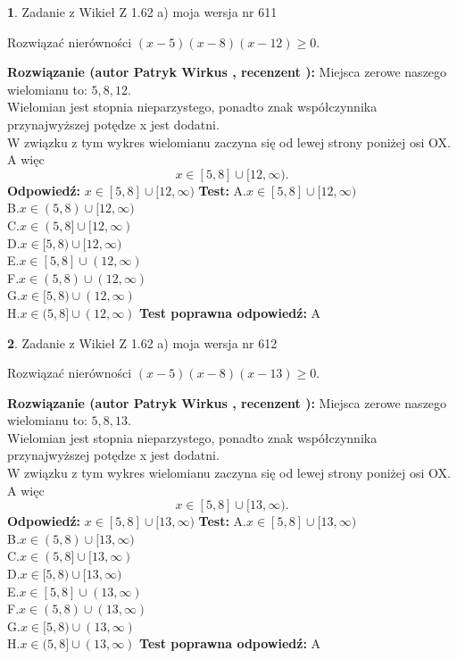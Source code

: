 \documentclass[12pt, a4paper]{article}
\theoremstyle{definition} %
\newtheorem{zad}{}
\newcommand{\zadStart}[1]{\begin{zad}#1\newline}
\newcommand{\zadStop}{\end{zad}}
\newcommand{\rozwStart}[2]{\noindent \textbf{Rozwiązanie (autor #1 , recenzent #2): }\newline}
\newcommand{\rozwStop}{\newline}
\newcommand{\odpStart}{\noindent \textbf{Odpowiedź:}\newline}
\newcommand{\odpStop}{\newline}
\newcommand{\testStart}{\noindent \textbf{Test:}\newline}
\newcommand{\testStop}{\newline}
\newcommand{\kluczStart}{\noindent \textbf{Test poprawna odpowiedź:}\newline}
\newcommand{\kluczStop}{\newline}
\begin{document}
\zadStart{Zadanie z Wikieł Z 1.62 a) moja wersja nr 611}

Rozwiązać nierówności $(x-5)(x-8)(x-12)\ge0$.
\zadStop
\rozwStart{Patryk Wirkus}{}
Miejsca zerowe naszego wielomianu to: $5, 8, 12$.\\
Wielomian jest stopnia nieparzystego, ponadto znak współczynnika przy\linebreak najwyższej potędze x jest dodatni.\\ W związku z tym wykres wielomianu zaczyna się od lewej strony poniżej osi OX. A więc $$x \in [5,8] \cup [12,\infty).$$
\rozwStop
\odpStart
$x \in [5,8] \cup [12,\infty)$
\odpStop
\testStart
A.$x \in [5,8] \cup [12,\infty)$\\
B.$x \in (5,8) \cup [12,\infty)$\\
C.$x \in (5,8] \cup [12,\infty)$\\
D.$x \in [5,8) \cup [12,\infty)$\\
E.$x \in [5,8] \cup (12,\infty)$\\
F.$x \in (5,8) \cup (12,\infty)$\\
G.$x \in [5,8) \cup (12,\infty)$\\
H.$x \in (5,8] \cup (12,\infty)$
\testStop
\kluczStart
A
\kluczStop



\zadStart{Zadanie z Wikieł Z 1.62 a) moja wersja nr 612}

Rozwiązać nierówności $(x-5)(x-8)(x-13)\ge0$.
\zadStop
\rozwStart{Patryk Wirkus}{}
Miejsca zerowe naszego wielomianu to: $5, 8, 13$.\\
Wielomian jest stopnia nieparzystego, ponadto znak współczynnika przy\linebreak najwyższej potędze x jest dodatni.\\ W związku z tym wykres wielomianu zaczyna się od lewej strony poniżej osi OX. A więc $$x \in [5,8] \cup [13,\infty).$$
\rozwStop
\odpStart
$x \in [5,8] \cup [13,\infty)$
\odpStop
\testStart
A.$x \in [5,8] \cup [13,\infty)$\\
B.$x \in (5,8) \cup [13,\infty)$\\
C.$x \in (5,8] \cup [13,\infty)$\\
D.$x \in [5,8) \cup [13,\infty)$\\
E.$x \in [5,8] \cup (13,\infty)$\\
F.$x \in (5,8) \cup (13,\infty)$\\
G.$x \in [5,8) \cup (13,\infty)$\\
H.$x \in (5,8] \cup (13,\infty)$
\testStop
\kluczStart
A
\kluczStop
\end{document}

